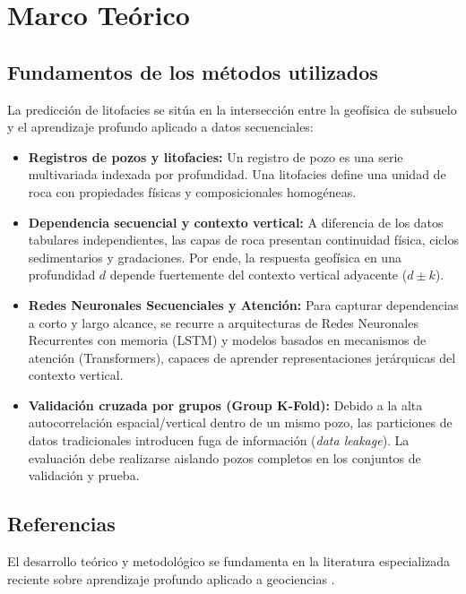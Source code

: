\documentclass[11pt,a4paper]{article}
\begin{document}
\section{Marco Teórico}

\subsection{Fundamentos de los métodos utilizados}
La predicción de litofacies se sitúa en la intersección entre la geofísica de subsuelo y el aprendizaje profundo aplicado a datos secuenciales:
\begin{itemize}
    \item \textbf{Registros de pozos y litofacies:} Un registro de pozo es una serie multivariada indexada por profundidad. Una litofacies define una unidad de roca con propiedades físicas y composicionales homogéneas.
    \item \textbf{Dependencia secuencial y contexto vertical:} A diferencia de los datos tabulares independientes, las capas de roca presentan continuidad física, ciclos sedimentarios y gradaciones. Por ende, la respuesta geofísica en una profundidad $d$ depende fuertemente del contexto vertical adyacente ($d \pm k$).
    \item \textbf{Redes Neuronales Secuenciales y Atención:} Para capturar dependencias a corto y largo alcance, se recurre a arquitecturas de Redes Neuronales Recurrentes con memoria (LSTM) y modelos basados en mecanismos de atención (Transformers), capaces de aprender representaciones jerárquicas del contexto vertical.
    \item \textbf{Validación cruzada por grupos (Group K-Fold):} Debido a la alta autocorrelación espacial/vertical dentro de un mismo pozo, las particiones de datos tradicionales introducen fuga de información (\emph{data leakage}). La evaluación debe realizarse aislando pozos completos en los conjuntos de validación y prueba.
\end{itemize}

\subsection{Referencias}
El desarrollo teórico y metodológico se fundamenta en la literatura especializada reciente sobre aprendizaje profundo aplicado a geociencias \cite{xie2024, carvalho2026, bormann2020, jamshidi2023, zhao2025}.
\end{document}

